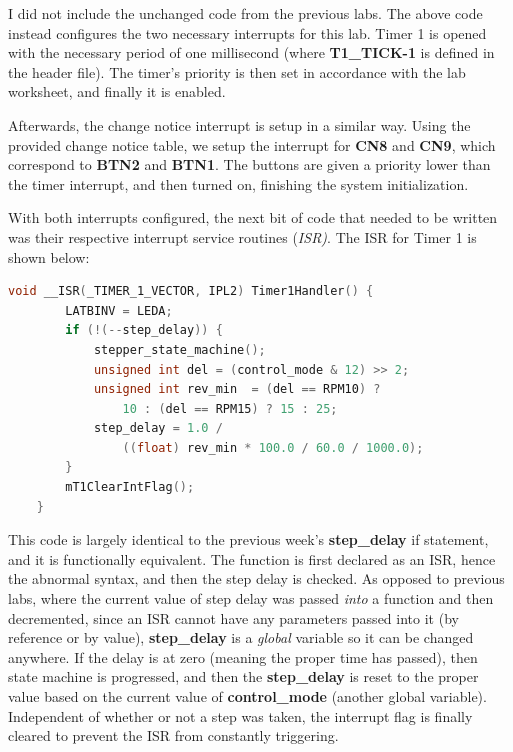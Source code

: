 \documentclass[a4paper, 12pt]{article}
\begin{document}
I did not include the unchanged code from the previous labs. The above code instead configures the two necessary interrupts for this lab. Timer 1 is opened with the necessary period of one millisecond (where \textbf{T1\_TICK-1} is defined in the header file). The timer's priority is then set in accordance with the lab worksheet, and finally it is enabled.

Afterwards, the change notice interrupt is setup in a similar way. Using the provided change notice table, we setup the interrupt for \textbf{CN8} and \textbf{CN9}, which correspond to \textbf{BTN2} and \textbf{BTN1}. The buttons are given a priority lower than the timer interrupt, and then turned on, finishing the system initialization.

With both interrupts configured, the next bit of code that needed to be written was their respective interrupt service routines (\textit{ISR)}. The ISR for Timer 1 is shown below:

	\begin{mdframed}[backgroundcolor=code-gray, roundcorner=10pt,
								innerleftmargin=5, innertopmargin=5, innerbottommargin=5]	
	\begin{lstlisting}[language=C, caption=Timer 1 Interrupt Service Routine, tabsize=2]
	void __ISR(_TIMER_1_VECTOR, IPL2) Timer1Handler() {
		LATBINV = LEDA;
		if (!(--step_delay)) {
			stepper_state_machine();
			unsigned int del = (control_mode & 12) >> 2;
			unsigned int rev_min  = (del == RPM10) ?
				10 : (del == RPM15) ? 15 : 25;
			step_delay = 1.0 /
				((float) rev_min * 100.0 / 60.0 / 1000.0);
		}
		mT1ClearIntFlag();
	}
	\end{lstlisting}
	\end{mdframed}
	
This code is largely identical to the previous week's \textbf{step\_delay} if statement, and it is functionally equivalent. The function is first declared as an ISR, hence the abnormal syntax, and then the step delay is checked. As opposed to previous labs, where the current value of step delay was passed \textit{into} a function and then decremented, since an ISR cannot have any parameters passed into it (by reference or by value), \textbf{step\_delay} is a \textit{global} variable so it can be changed anywhere. If the delay is at zero (meaning the proper time has passed), then state machine is progressed, and then the \textbf{step\_delay} is reset to the proper value based on the current value of \textbf{control\_mode} (another global variable). Independent of whether or not a step was taken, the interrupt flag is finally cleared to prevent the ISR from constantly triggering.
\end{document}
